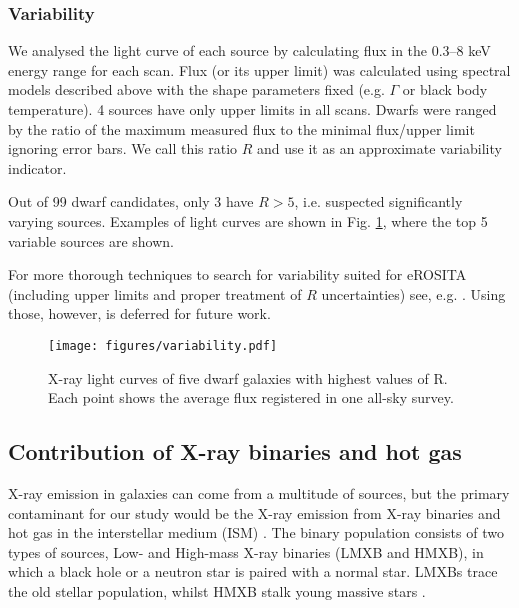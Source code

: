 \documentclass[fleqn,usenatbib]{mnras}
\begin{document}
\subsubsection{Variability}

We analysed the light curve of each source by calculating flux in the 0.3--8 keV energy range for each scan. Flux (or its upper limit) was calculated using spectral models described above with the shape parameters fixed (e.g. $\Gamma$ or black body temperature).  4 sources have only upper limits in all scans.
Dwarfs were ranged by the ratio of the maximum measured flux to the minimal flux/upper limit ignoring error bars. We call this ratio $R$ and use it as an approximate variability indicator. 


Out of 99 dwarf candidates, only 3 have  $R>5$, i.e. suspected significantly varying sources.  Examples of light curves are shown in Fig. \ref{fig:variability}, where the top 5 variable sources are shown. 


For  more thorough techniques to search for variability suited for eROSITA (including upper limits and proper treatment of $R$ uncertainties) see, e.g. \cite{Buchner2022, Medvedev2022}. Using those, however, is deferred for future work. 




\begin{figure}
    \texttt{[image: figures/variability.pdf]}
    \caption[X-ray light curves of five dwarf galaxies.]{X-ray light curves of five dwarf galaxies with highest values of R. Each point shows the  average flux registered in one all-sky survey. }
    \label{fig:variability}
\end{figure}





\subsection{Contribution of X-ray binaries and hot gas}
\label{sect:catalog:xrb}

X-ray emission in galaxies can come from a multitude of sources, but the primary contaminant for our study would be the X-ray emission from X-ray binaries and hot gas in the interstellar medium (ISM) \citep{Mineo2012b, Gilfanov2022}. The binary population consists of two types of sources, Low- and High-mass X-ray binaries (LMXB and HMXB), in which a black hole or a neutron star is paired with a normal star. LMXBs trace the old stellar population, whilst HMXB stalk young massive stars
\citep{Grimm2003, Lehmer2010, Mineo2012, Mineo2012b, Gilfanov2022}. 
\end{document}

